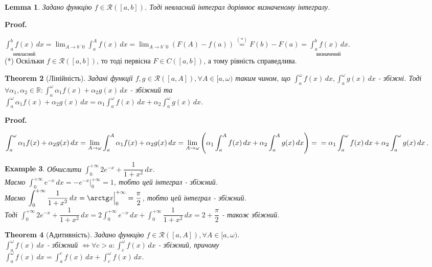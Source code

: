 \documentclass[a4paper, 10pt]{article}
\makeatletter
\def\huge{\displaystyle}
\def\qed{$\blacksquare$}
\theoremstyle{theoremdd}
\newtheorem{theorem}{Theorem}[subsection]
\theoremstyle{theoremdd}
\theoremstyle{theoremdd}
\theoremstyle{theoremdd}
\newtheorem{example}[theorem]{Example}
\theoremstyle{theoremdd}
\theoremstyle{theoremdd}
\theoremstyle{theoremdd}
\newtheorem{lemma}[theorem]{Lemma}
\theoremstyle{theoremdd}
\renewenvironment{proof}[1][Proof.\\]{\par
\pushQED{\hfill \qed}%
\normalfont \topsep6\p@\@plus6\p@\relax
\trivlist
\item\relax
{\bfseries
#1\@addpunct{.}}\hspace\labelsep\ignorespaces
}{%
\popQED\endtrivlist\@endpefalse
}
\makeatother
\begin{document}
\begin{lemma}
Задано функцію $f \in \mathcal{R}([a,b])$. Тоді невласний інтеграл дорівнює визначеному інтегралу.
\end{lemma}

\begin{proof}
$\underset{\text{невласний}}{\huge\int_a^b f(x)\,dx} = \huge \lim_{A \to b^-0} \int_a^A f(x)\,dx = \huge \lim_{A \to b^-0} (F(A)-f(a)) \overset{(*)}{=} F(b) - F(a) = \underset{\text{визначений}}{\huge\int_a^b f(x)\,dx}$.\\
(*) Оскільки $f \in \mathcal{R}([a,b])$, то тоді первісна $F \in C([a,b])$, а тому рівність справедлива.
\end{proof}

\begin{theorem}[Лінійність]
Задані функції $f,g \in \mathcal{R}([a,A]), \forall A \in [a,\omega)$ таким чином, що $\huge\int_a^\omega f(x)\,dx, \huge\int_a^\omega g(x)\,dx$ - збіжні. Тоді $\forall \alpha_1,\alpha_2 \in \mathbb{R}: \huge\int_a^\omega \alpha_1 f(x) + \alpha_2 g(x)\,dx$ - збіжний та\\
$\huge\int_a^\omega \alpha_1 f(x) + \alpha_2 g(x)\,dx = \alpha_1 \int_a^\omega f(x)\,dx + \alpha_2 \int_a^\omega g(x)\,dx$.
\end{theorem}

\begin{proof}
$\huge\int_a^\omega \alpha_1 f(x) + \alpha_2 g(x)\,dx = \lim_{A \to \omega} \int_a^A \alpha_1 f(x) + \alpha_2 g(x)\,dx = \lim_{A \to \omega} \left( \alpha_1 \int_a^A f(x)\,dx + \alpha_2 \int_a^A g(x)\,dx \right) = \\ = \alpha_1 \int_a^\omega f(x)\,dx + \alpha_2 \int_a^\omega g(x)\,dx$.
\end{proof}

\begin{example}
Обчислити $\huge\int_0^{+\infty} 2e^{-x} + \dfrac{1}{1+x^2}\,dx$.\\
Маємо $\huge\int_0^{+\infty} e^{-x}\,dx = -e^{-x} \Big|_0^{+\infty} = 1$, тобто цей інтеграл - збіжний.\\
Маємо $\huge\int_0^{+\infty} \dfrac{1}{1+x^2}\,dx = \arctg x \Big|_0^{+\infty} = \dfrac{\pi}{2}$, тобто цей інтеграл - збіжний.\\
Тоді $\huge\int_0^{+\infty} 2e^{-x} + \dfrac{1}{1+x^2}\,dx = 2 \int_0^{+\infty} e^{-x}\,dx + \int_0^{+\infty} \dfrac{1}{1+x^2}\,dx = 2 + \dfrac{\pi}{2}$ - також збіжний.
\end{example}

\begin{theorem}[Адитивність]
Задано функцію $f \in \mathcal{R}([a,A]), \forall A \in [a,\omega)$.\\
$\huge\int_a^\omega f(x)\,dx$ - збіжний $\iff \forall c > a: \huge\int_c^\omega f(x)\,dx$ - збіжний, причому \\ $\huge\int_a^\omega f(x)\,dx = \int_a^c f(x)\,dx + \int_c^\omega f(x)\,dx$.
\end{theorem}
\end{document}

